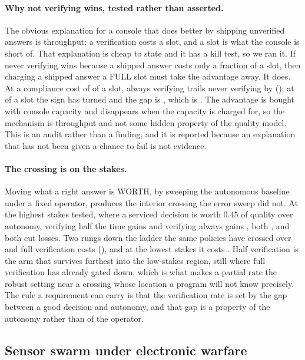 \documentclass[11pt]{article}
\begin{document}
\paragraph{Why not verifying wins, tested rather than asserted.} The obvious explanation for a
console that does better by shipping unverified answers is throughput: a verification costs a slot,
and a slot is what the console is short of. That explanation is cheap to state and it has a kill
test, so we ran it. If never verifying wins because a shipped answer costs only a fraction of a
slot, then charging a shipped answer a FULL slot must take the advantage away. It does. At a
compliance cost of \DrComplyLo{} of a slot, always verifying trails never verifying by
\DrComplyQuarter{} (\DrComplyQuarterV{}); at \DrComplyHi{} of a slot the sign has turned and the
gap is \DrComplyFull{}, which is \DrComplyFullV{}. The advantage is bought with console capacity
and disappears when the capacity is charged for, so the mechanism is throughput and not some hidden
property of the quality model. This is an audit rather than a finding, and it is reported because
an explanation that has not been given a chance to fail is not evidence.

\paragraph{The crossing is on the stakes.} Moving what a right answer is WORTH, by sweeping the
autonomous baseline under a fixed operator, produces the interior crossing the error sweep did not.
At the highest stakes tested, where a serviced decision is worth 0.45 of quality over autonomy,
verifying half the time gains \DrStakeHalfHi{} and verifying always gains \DrStakeFullHi{}, both
\DrStakeHiV{}, and both cut losses. Two rungs down the ladder the same policies have crossed over
and full verification costs \DrStakeFullMid{} (\DrStakeFullMidV{}), and at the lowest stakes it
costs \DrStakeFullLo{}. Half verification is the arm that survives furthest into the low-stakes
region, still \DrStakeHalfMidV{} where full verification has already gated down, which is what makes
a partial rate the robust setting near a crossing whose location a program will not know precisely.
The rule a requirement can carry is that the verification rate is set by the gap between a good
decision and autonomy, and that gap is a property of the autonomy rather than of the operator.

\subsection{Sensor swarm under electronic warfare}
\label{subsec:uc5}
\end{document}
